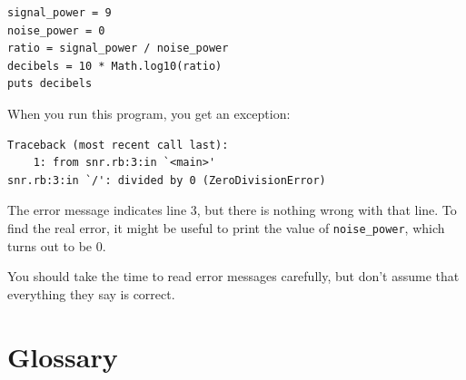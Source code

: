 \documentclass[10pt]{book}
\begin{document}
\begin{verbatim}
signal_power = 9
noise_power = 0
ratio = signal_power / noise_power
decibels = 10 * Math.log10(ratio)
puts decibels
\end{verbatim}
%
When you run this program, you get an exception:
%

\begin{verbatim}
Traceback (most recent call last):
	1: from snr.rb:3:in `<main>'
snr.rb:3:in `/': divided by 0 (ZeroDivisionError)
\end{verbatim}
%
The error message indicates line 3, but there is nothing
wrong with that line.  To find the real error, it might be
useful to print the value of {\tt noise\_power}, which turns out to
be 0.

You should take the time to read error messages carefully, but don't
assume that everything they say is correct.


\section{Glossary}
\end{document}
